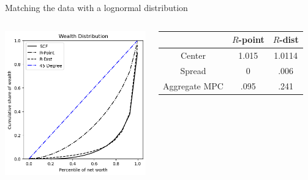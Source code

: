 \documentclass{beamer}
\begin{document}
\begin{frame}{Matching the data with a lognormal distribution}
  
      \begin{columns}
    \centering
    \includegraphics[width=.9\textwidth]{Figures/hetreturns-PYlognrm.png}
    
    \hspace{-5mm}
    \centering
    
  \begin{tabular}{|c|c|c|}

\hline
& $R$-point & $R$-dist \\
\hline
Center & 1.015 & 1.0114 \\
Spread & 0  &  .006 \\
Aggregate MPC & .095 &  .241 \\
\hline
\end{tabular}
    
  \end{columns}
  
\end{frame}
\end{document}

